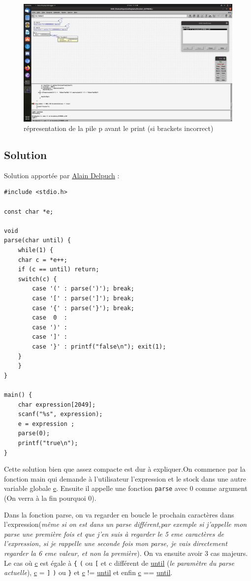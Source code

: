 \documentclass[11pt]{article}
\begin{document}
\begin{figure}[htbp]
\centering
\includegraphics[width=.9\linewidth]{./img/bracketsFinFalse.png}
\caption{\label{fig:orgace48fa}
répresentation de la pile p avant le print (si brackets incorrect)}
\end{figure}

\subsection{Solution}
\label{sec:org65d1afd}

Solution apportée par \uline{Alain Delpuch} :


\begin{verbatim}
#include <stdio.h>

const char *e;

void 
parse(char until) {
    while(1) {
	char c = *e++;
	if (c == until) return;
	switch(c) {
	    case '(' : parse(')'); break;
	    case '[' : parse(']'); break;
	    case '{' : parse('}'); break;
	    case  0  :
	    case ')' : 
	    case ']' :
	    case '}' : printf("false\n"); exit(1);
	}
    }
}

main() {
    char expression[2049];
    scanf("%s", expression);
    e = expression ;
    parse(0); 
    printf("true\n");
}
\end{verbatim}

Cette solution bien que assez compacte est dur à expliquer.On commence par la fonction main qui demande à l'utilisateur l'expression et le stock dans une autre variable globale \uline{e}. Ensuite il appelle une fonction \texttt{parse} avec 0 comme argument (On verra à la fin pourquoi 0).

Dans la fonction parse, on va regarder en boucle le prochain caractères dans l'expression(\emph{même si on est dans un parse différent,par exemple si j'appelle mon parse une première fois et que j'en suis à regarder le 5 eme caractères de l'expression, si je rappelle une seconde fois mon parse, je vais directement regarder la 6 eme valeur, et non la première}). On va ensuite avoir 3 cas majeurs. Le cas où \uline{c} est égale à \texttt{\{} \texttt{(} ou \texttt{[} et c différent de \uline{until} (\emph{le paramètre du parse actuelle}), \uline{c} = \texttt{]} \texttt{)} ou \texttt{\}} et \uline{c} != \uline{until} et enfin \uline{c} == \uline{until}.
\end{document}
